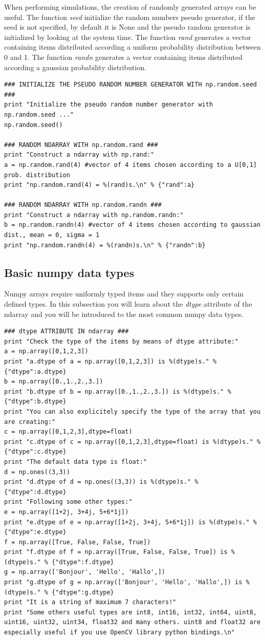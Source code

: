 \documentclass[aps,letterpaper,10pt]{revtex4}
\begin{document}
When performing simulations, the creation of randomly generated arrays can be useful. The function \textit{seed} initialize the random numbers pseudo generator, if the seed is not specified, by default it is None and the pseudo random generator is initialized by looking at the system time. The function \textit{rand} generates a vector containing items distributed according a uniform probability distribution between 0 and 1. The function \textit{randn} generates a vector containing items distributed according a gaussian probability distribution.
\begin{lstlisting}
### INITIALIZE THE PSEUDO RANDOM NUMBER GENERATOR WITH np.random.seed ###
print "Initialize the pseudo random number generator with np.random.seed ..."
np.random.seed()

### RANDOM NDARRAY WITH np.random.rand ###
print "Construct a ndarray with np.rand:"
a = np.random.rand(4) #vector of 4 items chosen according to a U[0,1] prob. distribution
print "np.random.rand(4) = %(rand)s.\n" % {"rand":a}

### RANDOM NDARRAY WITH np.random.randn ###
print "Construct a ndarray with np.random.randn:"
b = np.random.randn(4) #vector of 4 items chosen according to gaussian dist., mean = 0, sigma = 1
print "np.random.randn(4) = %(randn)s.\n" % {"randn":b}
\end{lstlisting}
\subsection{Basic numpy data types}
Numpy arrays require uniformly typed items and they supports only certain defined types. In this subsection you will learn about the \textit{dtype} attribute of the ndarray and you will be introduced to the most common numpy data types.
\begin{lstlisting}
### dtype ATTRIBUTE IN ndarray ###
print "Check the type of the items by means of dtype attribute:"
a = np.array([0,1,2,3])
print "a.dtype of a = np.array([0,1,2,3]) is %(dtype)s." % {"dtype":a.dtype}
b = np.array([0.,1.,2.,3.])
print "b.dtype of b = np.array([0.,1.,2.,3.]) is %(dtype)s." % {"dtype":b.dtype}
print "You can also explicitely specify the type of the array that you are creating:"
c = np.array([0,1,2,3],dtype=float)
print "c.dtype of c = np.array([0,1,2,3],dtype=float) is %(dtype)s." % {"dtype":c.dtype}
print "The default data type is float:"
d = np.ones((3,3))
print "d.dtype of d = np.ones((3,3)) is %(dtype)s." % {"dtype":d.dtype}
print "Following some other types:"
e = np.array([1+2j, 3+4j, 5+6*1j])
print "e.dtype of e = np.array([1+2j, 3+4j, 5+6*1j]) is %(dtype)s." % {"dtype":e.dtype}
f = np.array([True, False, False, True])
print "f.dtype of f = np.array([True, False, False, True]) is %(dtype)s." % {"dtype":f.dtype}
g = np.array(['Bonjour', 'Hello', 'Hallo',])
print "g.dtype of g = np.array(['Bonjour', 'Hello', 'Hallo',]) is %(dtype)s." % {"dtype":g.dtype}
print "It is a string of maximum 7 characters!"
print "Some others useful types are int8, int16, int32, int64, uint8, uint16, uint32, uint34, float32 and many others. uint8 and float32 are especially useful if you use OpenCV library python bindings.\n"
\end{lstlisting}
\end{document}

